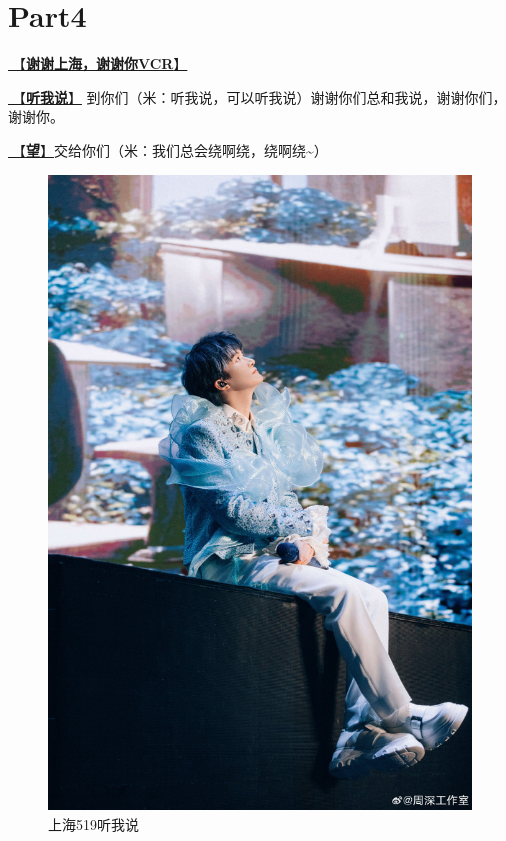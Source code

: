 \documentclass[]{ctexbook}
\begin{document}
\section{Part4}\label{shanghai-20240519-part4}

\hyperref[thank-you-vcr]{🎥【\textbf{谢谢上海，谢谢你VCR}】}

\hyperref[listen-to-me]{🎵【\textbf{听我说}】} 到你们（米：听我说，可以听我说）谢谢你们总和我说，谢谢你们，谢谢你。

\hyperref[hope]{🎵【\textbf{望}】}交给你们（米：我们总会绕啊绕，绕啊绕\textasciitilde）

\begin{figure}

{\centering \includegraphics[width=400pt]{img/shanghai20240519/001} 

}

\caption{上海519听我说}\label{fig:unnamed-chunk-39}
\end{figure}
\end{document}
